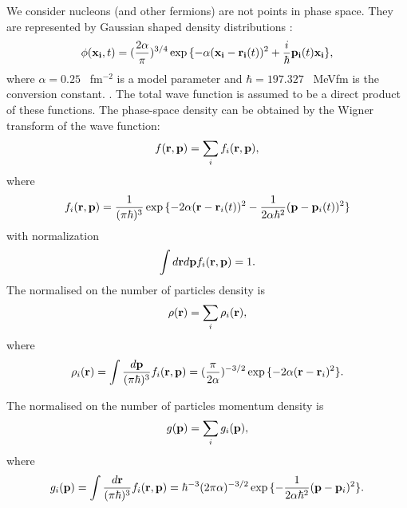 \hspace{1.0em}We consider nucleons (and other fermions)
are not points in phase space. They are represented by Gaussian shaped
density distributions \cite{URQMD97}:
\begin{equation}
\label{PBS3}\phi({\bf x_i}, t) = (\frac{2\alpha}{\pi})^{3/4}
\exp{\{-\alpha ({\bf x_i}
- {\bf r_i} (t))^2 + \frac{i}{\hbar}{\bf p_i} (t) {\bf x_i}\}}, 
\end{equation}
where $\alpha=0.25$ \ fm$^{-2}$ is a model parameter and $\hbar =
197.327$ \ MeVfm is the conversion constant. .  The total wave function
is assumed to be a direct product of these functions.  The phase-space
density can be obtained by the Wigner transform of the wave function:
\begin{equation}
\label{PBS4} f({\bf r}, {\bf p})=\sum_{i}f_i({\bf r}, {\bf p}),
\end{equation}
where
\begin{equation}
\label{PBS5} f_i({\bf r}, {\bf p})= \frac{1}{(\pi\hbar)^3}\exp{\{-2\alpha ({\bf r}
- {\bf r}_i(t) )^2 - \frac{1}{2\alpha {\hbar}^2}({\bf p}-{\bf p}_i(t))^2 \}}
\end{equation} 
with normalization
\begin{equation}
\label{PBS6} \int d{\bf r}d{\bf p}f_i({\bf r}, {\bf p})=1.
\end{equation}
The normalised on the number of particles density is
\begin{equation}
\label{PBS7} \rho({\bf r})=\sum_{i}\rho_i({\bf r}),
\end{equation}
where
\begin{equation}
\label{PBS8} \rho_i({\bf r})=\int \frac{d{\bf p}}{(\pi\hbar)^3}f_i({\bf r},{\bf p})=
(\frac{\pi}{2\alpha})^{-3/2}\exp{\{-2\alpha ({\bf r}-{\bf r}_i)^2\}}.
\end{equation}

The normalised on the number of particles momentum density is
\begin{equation}
\label{PBS9} g({\bf p})=\sum_{i}g_i({\bf p}),
\end{equation}
where
\begin{equation}
\label{PBS10} g_i({\bf p})=\int \frac{d{\bf r}}{(\pi\hbar)^3}f_i({\bf r},{\bf p})=
\hbar^{-3}(2\pi\alpha )^{-3/2}\exp{\{-\frac{1}{2\alpha \hbar^2} ({\bf p}-{\bf p}_i)^2\}}.
\end{equation}

